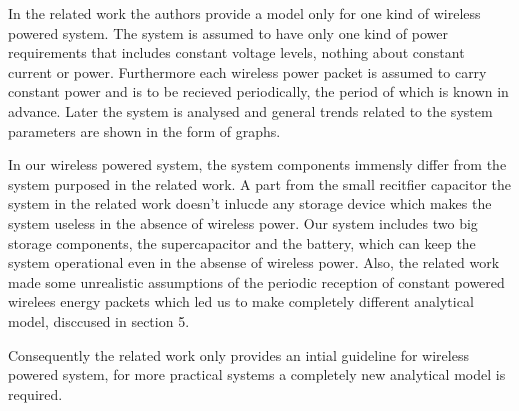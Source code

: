 In the related work \cite{paper} the authors provide a model only for one kind of wireless powered system. The system is assumed to have only one kind of power requirements that includes constant voltage levels, nothing about constant current or power. Furthermore each wireless power packet is assumed to carry constant power and is to be recieved periodically, the period of which is known in advance. Later the system is analysed and general trends related to the system parameters are shown in the form of graphs.

In our wireless powered system, the system components immensly differ from the system purposed in the related work.
A part from the small recitfier capacitor the system in the related work doesn't inlucde any storage device which makes the system useless in the absence of wireless power. Our system includes two big storage components, the supercapacitor and the battery, which can keep the system operational even in the absense of wireless power. Also, the related work made some unrealistic assumptions of the periodic reception of constant powered wirelees energy packets which led us to make completely different analytical model, disccused in section 5. 

Consequently the related work only provides an intial guideline for wireless powered system, for more practical systems a completely new analytical model is required.      
 